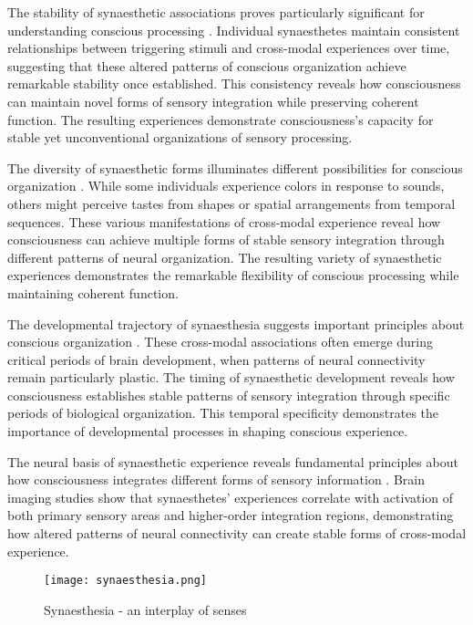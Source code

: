 \begin{refsection}
The stability of synaesthetic associations proves particularly significant for understanding conscious processing \cite{Dixon2004}. Individual synaesthetes maintain consistent relationships between triggering stimuli and cross-modal experiences over time, suggesting that these altered patterns of conscious organization achieve remarkable stability once established. This consistency reveals how consciousness can maintain novel forms of sensory integration while preserving coherent function. The resulting experiences demonstrate consciousness's capacity for stable yet unconventional organizations of sensory processing.

The diversity of synaesthetic forms illuminates different possibilities for conscious organization \cite{Ward2013}. While some individuals experience colors in response to sounds, others might perceive tastes from shapes or spatial arrangements from temporal sequences. These various manifestations of cross-modal experience reveal how consciousness can achieve multiple forms of stable sensory integration through different patterns of neural organization. The resulting variety of synaesthetic experiences demonstrates the remarkable flexibility of conscious processing while maintaining coherent function.

The developmental trajectory of synaesthesia suggests important principles about conscious organization \cite{Simner2012}. These cross-modal associations often emerge during critical periods of brain development, when patterns of neural connectivity remain particularly plastic. The timing of synaesthetic development reveals how consciousness establishes stable patterns of sensory integration through specific periods of biological organization. This temporal specificity demonstrates the importance of developmental processes in shaping conscious experience.

The neural basis of synaesthetic experience reveals fundamental principles about how consciousness integrates different forms of sensory information \cite{Nunn2002}. Brain imaging studies show that synaesthetes' experiences correlate with activation of both primary sensory areas and higher-order integration regions, demonstrating how altered patterns of neural connectivity can create stable forms of cross-modal experience.

\begin{figure}[h]
    \centering
    \texttt{[image: synaesthesia.png]}

    \caption{Synaesthesia - an interplay of senses}
\end{figure}


\end{refsection}
